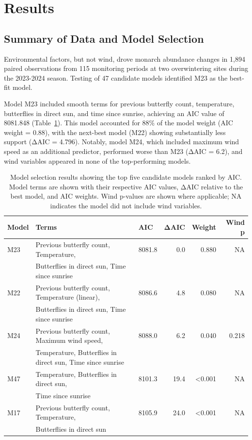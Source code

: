 \section{Results}

\subsection{Summary of Data and Model Selection}

Environmental factors, but not wind, drove monarch abundance changes in 1,894 paired observations from 115 monitoring periods at two overwintering sites during the 2023-2024 season. Testing of 47 candidate models identified M23 as the best-fit model.

Model M23 included smooth terms for previous butterfly count, temperature, butterflies in direct sun, and time since sunrise, achieving an AIC value of 8081.848 (Table~\ref{tab:model_selection}). This model accounted for 88\% of the model weight (AIC weight = 0.88), with the next-best model (M22) showing substantially less support (ΔAIC = 4.796). Notably, model M24, which included maximum wind speed as an additional predictor, performed worse than M23 (ΔAIC = 6.2), and wind variables appeared in none of the top-performing models.

\begin{table}[htbp]
\centering
\caption{Model selection results showing the top five candidate models ranked by AIC. Model terms are shown with their respective AIC values, ΔAIC relative to the best model, and AIC weights. Wind p-values are shown where applicable; NA indicates the model did not include wind variables.}
\label{tab:model_selection}
\begin{tabular}{lllrrr}
\hline
Model & Terms & AIC & ΔAIC & Weight & Wind p \\
\hline
M23 & Previous butterfly count, Temperature, & 8081.8 & 0.0 & 0.880 & NA \\
    & Butterflies in direct sun, Time since sunrise & & & & \\
M22 & Previous butterfly count, Temperature (linear), & 8086.6 & 4.8 & 0.080 & NA \\
    & Butterflies in direct sun, Time since sunrise & & & & \\
M24 & Previous butterfly count, Maximum wind speed, & 8088.0 & 6.2 & 0.040 & 0.218 \\
    & Temperature, Butterflies in direct sun, Time since sunrise & & & & \\
M47 & Temperature, Butterflies in direct sun, & 8101.3 & 19.4 & <0.001 & NA \\
    & Time since sunrise & & & & \\
M17 & Previous butterfly count, Temperature, & 8105.9 & 24.0 & <0.001 & NA \\
    & Butterflies in direct sun & & & & \\
\hline
\end{tabular}
\end{table}

